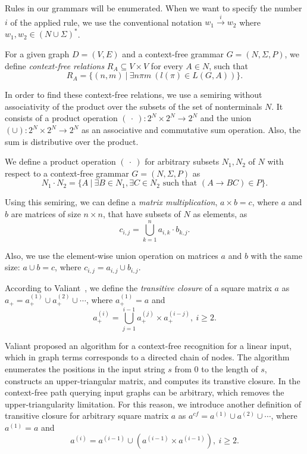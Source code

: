 Rules in our grammars will be enumerated. When we want to specify the number $i$ of the applied rule, we use the conventional notation \mbox{$w_1 \xrightarrow{i} w_2$} where \mbox{$w_1,w_2 \in (N \cup \Sigma)^*$}.

For a given graph \mbox{$D = (V, E)$} and a context-free grammar $G = (N, \Sigma, P)$, we define \emph{context-free relations} \mbox{$R_A \subseteq V \times V$} for every \mbox{$A \in N$}, such that $$R_A = \{(n,m)~|~\exists n \pi m~(l(\pi) \in L(G,A))\}.$$

In order to find these context-free relations, we use a semiring without associativity of the product over the subsets of the set of nonterminals $N$. It consists of a product operation $(~\cdot~) : 2^N \times 2^N \rightarrow 2^N$ and the union $(\cup) : 2^N \times 2^N \rightarrow 2^N$ as an associative and commutative sum operation. Also, the sum is distributive over the product.

We define a product operation $(~\cdot~)$ for arbitrary subsets \mbox{$N_1, N_2$} of $N$ with respect to a context-free grammar \mbox{$G = (N, \Sigma, P)$} as $$N_1 \cdot N_2 = \{A~|~\exists B \in N_1, \exists C \in N_2 \text{ such that }(A \rightarrow B C) \in P\}.$$

Using this semiring, we can define a \emph{matrix multiplication}, \mbox{$a \times b = c$}, where $a$ and $b$ are matrices of size $n\times n$, that have subsets of $N$ as elements, as $$c_{i,j} = \bigcup^{n}_{k=1}{a_{i,k} \cdot b_{k,j}}.$$

Also, we use the element-wise union operation on matrices $a$ and $b$ with the same size: \mbox{$a \cup b = c$}, where $c_{i,j} = a_{i,j} \cup b_{i,j}.$

According to Valiant~\cite{valiant}, we define the \emph{transitive closure} of a square matrix $a$ as \mbox{$a_+ = a^{(1)}_+ \cup a^{(2)}_+ \cup \cdots$}, where \mbox{$a^{(1)}_+ = a$} and $$a^{(i)}_+ = \bigcup^{i-1}_{j=1}{a^{(j)}_+ \times a^{(i-j)}_+}, ~i \ge 2.$$

Valiant proposed an algorithm for a context-free recognition for a linear input, which in graph terms corresponds to a directed chain of nodes. The algorithm enumerates the positions in the input string $s$ from 0 to the length of $s$, constructs an upper-triangular matrix, and computes its transtive closure. In the context-free path querying input graphs can be arbitrary, which removes the upper-triangularity  limitation. For this reason, we introduce another definition of transitive closure for arbitrary square matrix $a$ as \mbox{$a^{cf} = a^{(1)} \cup a^{(2)} \cup \cdots$}, where \mbox{$a^{(1)} = a$} and $$a^{(i)} = a^{(i-1)} \cup (a^{(i-1)} \times a^{(i-1)}), ~i \ge 2.$$

